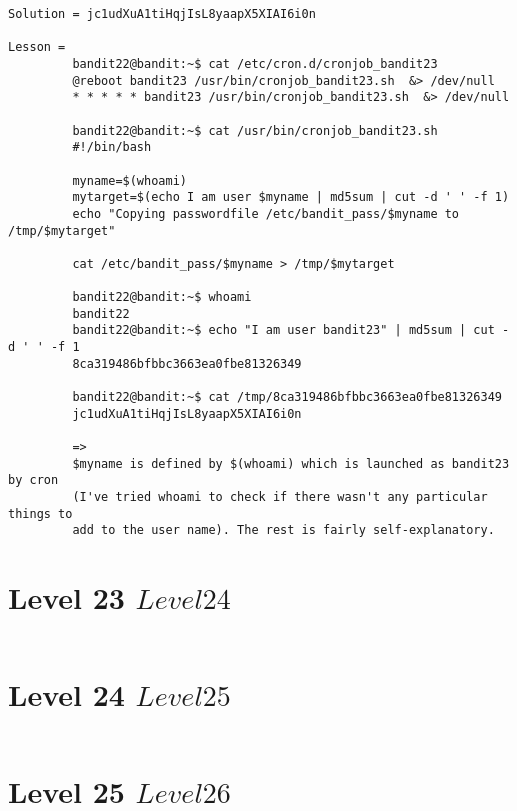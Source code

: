 \documentclass[a4paper]{report}
\begin{document}
\begin{verbatim}
Solution = jc1udXuA1tiHqjIsL8yaapX5XIAI6i0n

Lesson = 
		 bandit22@bandit:~$ cat /etc/cron.d/cronjob_bandit23
		 @reboot bandit23 /usr/bin/cronjob_bandit23.sh  &> /dev/null
		 * * * * * bandit23 /usr/bin/cronjob_bandit23.sh  &> /dev/null
		 
		 bandit22@bandit:~$ cat /usr/bin/cronjob_bandit23.sh 
		 #!/bin/bash
		 
		 myname=$(whoami)
		 mytarget=$(echo I am user $myname | md5sum | cut -d ' ' -f 1)
		 echo "Copying passwordfile /etc/bandit_pass/$myname to /tmp/$mytarget"
		 
		 cat /etc/bandit_pass/$myname > /tmp/$mytarget
		 
		 bandit22@bandit:~$ whoami
		 bandit22
		 bandit22@bandit:~$ echo "I am user bandit23" | md5sum | cut -d ' ' -f 1
		 8ca319486bfbbc3663ea0fbe81326349
		 
		 bandit22@bandit:~$ cat /tmp/8ca319486bfbbc3663ea0fbe81326349
		 jc1udXuA1tiHqjIsL8yaapX5XIAI6i0n

		 => 
		 $myname is defined by $(whoami) which is launched as bandit23 by cron 
		 (I've tried whoami to check if there wasn't any particular things to 
		 add to the user name). The rest is fairly self-explanatory.
\end{verbatim}


\section{Level 23 \rightarrow $ Level 24 $}

\begin{verbatim}

\end{verbatim}


\section{Level 24 \rightarrow $ Level 25 $}

\begin{verbatim}

\end{verbatim}


\section{Level 25 \rightarrow $ Level 26 $}

\begin{verbatim}

\end{verbatim}
\end{document}
